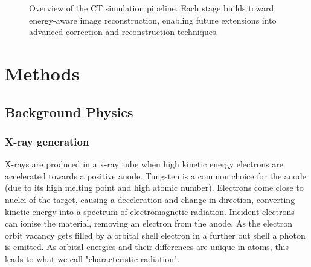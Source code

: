 \documentclass{article}
\theoremstyle{definition}
\begin{document}
\begin{figure}[H]
\centering
{}
\caption{Overview of the CT simulation pipeline. Each stage builds toward energy-aware image reconstruction, enabling future extensions into advanced correction and reconstruction techniques.}
\label{fig:pipeline}
\end{figure}

\section{Methods}

\subsection{Background Physics}
\subsubsection{X-ray generation}
X-rays are produced in  a x-ray tube when high kinetic energy electrons are accelerated towards a positive anode. Tungsten is a common choice for the anode (due to its high melting point and high atomic number). Electrons come close to nuclei of the target, causing a deceleration and change in direction, converting kinetic energy into a spectrum of electromagnetic radiation. Incident electrons can ionise the material, removing an electron from the anode. As the electron orbit vacancy gets filled by a orbital shell electron in a further out shell a photon is emitted. As orbital energies and their differences are unique in atoms, this leads to what we call "characteristic radiation".
\cite{Tafti2023}
\end{document}
